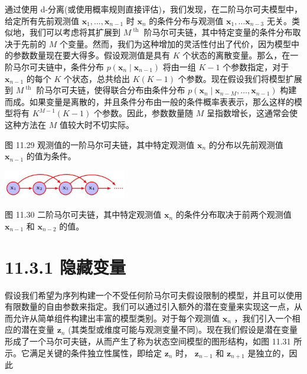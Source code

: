 \documentclass[10pt]{report}
\begin{document}
通过使用 d-分离(或使用概率规则直接评估)，我们发现，在二阶马尔可夫模型中，给定所有先前观测值 \({\mathbf{x}}_{1},\ldots ,{\mathbf{x}}_{n - 1}\) 时 \({\mathbf{x}}_{n}\) 的条件分布与观测值 \({\mathbf{x}}_{1},\ldots {\mathbf{x}}_{n - 3}\) 无关。类似地，我们可以考虑将其扩展到 \({M}^{\text{ th }}\) 阶马尔可夫链，其中特定变量的条件分布取决于先前的 \(M\) 个变量。然而，我们为这种增加的灵活性付出了代价，因为模型中的参数数量现在要大得多。假设观测值是具有 \(K\) 个状态的离散变量。那么，在一阶马尔可夫链中，条件分布 \(p\left( {{\mathbf{x}}_{n} \mid  {\mathbf{x}}_{n - 1}}\right)\) 将由一组 \(K - 1\) 个参数指定，对于 \({\mathbf{x}}_{n - 1}\) 的每个 \(K\) 个状态，总共给出 \(K\left( {K - 1}\right)\) 个参数。现在假设我们将模型扩展到 \({M}^{\text{ th }}\) 阶马尔可夫链，使得联合分布由条件分布 \(p\left( {{\mathbf{x}}_{n} \mid  {\mathbf{x}}_{n - M},\ldots ,{\mathbf{x}}_{n - 1}}\right)\) 构建而成。如果变量是离散的，并且条件分布由一般的条件概率表表示，那么这样的模型将有 \({K}^{M - 1}\left( {K - 1}\right)\) 个参数。因此，参数数量随 \(M\) 呈指数增长，这通常会使这种方法在 \(M\) 值较大时不切实际。

图 11.29 观测值的一阶马尔可夫链，其中特定观测值 \({\mathbf{x}}_{n}\) 的分布以先前观测值 \({\mathbf{x}}_{n - 1}\) 的值为条件。

\begin{center}
\includegraphics[max width=0.4\textwidth]{images/0194e279-9b28-703a-88f4-c3ac21e2010d_371_947_356_592_138_0.jpg}
\end{center}
\hspace*{3em} 

图 11.30 二阶马尔可夫链，其中特定观测值 \({\mathbf{x}}_{n}\) 的条件分布取决于前两个观测值 \({\mathbf{x}}_{n - 1}\) 和 \({\mathbf{x}}_{n - 2}\) 的值。

\section*{11.3.1 隐藏变量}

假设我们希望为序列构建一个不受任何阶马尔可夫假设限制的模型，并且可以使用有限数量的自由参数来指定。我们可以通过引入额外的潜在变量来实现这一点，从而允许从简单组件构建出丰富的模型类别。对于每个观测值 \({\mathbf{x}}_{n}\) ，我们引入一个相应的潜在变量 \({\mathbf{z}}_{n}\) (其类型或维度可能与观测变量不同)。现在我们假设是潜在变量形成了一个马尔可夫链，从而产生了称为状态空间模型的图形结构，如图 11.31 所示。它满足关键的条件独立性属性，即给定 \({\mathbf{z}}_{n}\) 时， \({\mathbf{z}}_{n - 1}\) 和 \({\mathbf{z}}_{n + 1}\) 是独立的，因此
\end{document}
